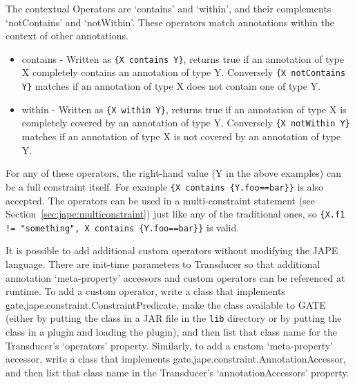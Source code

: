 
The contextual Operators are `contains' and `within', and their complements
`notContains' and `notWithin'. These operators match annotations within the
context of other annotations.

\begin{itemize}
\item contains - Written as \verb|{X contains Y}|, returns true if an 
annotation of type X completely contains an annotation of type Y.  Conversely
\verb|{X notContains Y}| matches if an annotation of type X does not contain
one of type Y.
\item within - Written as \verb|{X within Y}|, returns true if an annotation 
of type X is completely covered by an annotation of type Y.  Conversely
\verb|{X notWithin Y}| matches if an annotation of type X is not covered by an
annotation of type Y.
\end{itemize}

For any of these operators, the right-hand value (Y in the above examples) can
be a full constraint itself.  For example \verb|{X contains {Y.foo==bar}}| is
also accepted.  The operators can be used in a multi-constraint statement (see
Section~\ref{sec:jape:multiconstraint}) just like any of the traditional
ones, so \verb|{X.f1 != "something", X contains {Y.foo==bar}}| is valid.


It is possible to add additional custom operators without modifying the JAPE
language.  There are init-time parameters to Transducer so that additional 
annotation `meta-property' accessors and custom operators can be referenced at 
runtime.  To add a custom operator, write a class that implements
gate.jape.constraint.ConstraintPredicate, make the class available to GATE
(either by putting the class in a JAR file in the \texttt{lib} directory or by
putting the class in a plugin and loading the plugin), and then list that
class name for the Transducer's `operators' property.  Similarly, to add a
custom `meta-property' accessor, write a class that implements
gate.jape.constraint.AnnotationAccessor, and then list that class name in the
Transducer's `annotationAccessors' property.


